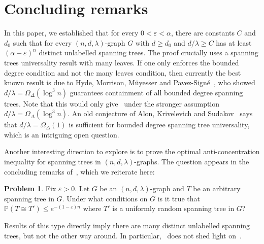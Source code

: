 \documentclass[reqno,final,a4paper]{amsart}
\numberwithin{equation}{section}
\theoremstyle{definition}
\newtheorem{problem}[theorem]{Problem}
\theoremstyle{remark}
\renewcommand{\Pr}{\mathbb{P}}
\newcommand{\eps}{\varepsilon}
\begin{document}
\section{Concluding remarks}
In this paper, we established that for every $0<\eps<\alpha$, there are constants $C$ and $d_0$ such that for every $(n,d,\lambda)$-graph $G$ with $d\geq d_0$ and $d/\lambda\geq C$ has at least $(\alpha-\eps)^n$ distinct unlabelled spanning trees.
The proof crucially uses a spanning trees universality result with many leaves. If one only enforces the bounded degree condition and not the many leaves condition, then currently the best known result is due to Hyde, Morrison, M\"{u}yesser and Pavez-Sign\'{e}~\cite{Hyde-et-al}, who showed $d/\lambda =\Omega_\Delta(\log ^3n)$ guarantees containment of all bounded degree spanning trees. 
Note that this would only give~ under the stronger assumption $d/\lambda = \Omega_\Delta(\log^3n)$.
An old conjecture of Alon, Krivelevich and Sudakov~\cite{Alon-et-al} says that $d/\lambda = \Omega_\Delta(1)$ is sufficient for bounded degree spanning tree universality, which is an intriguing open question.

Another interesting direction to explore is to prove the optimal anti-concentration inequality for spanning trees in $(n,d,\lambda)$-graphs. The question appears in the concluding remarks of~\cite{Lee}, which we reiterate here:
\begin{problem}\label{prob}
    Fix $\eps > 0$.
    Let $G$ be an $(n,d,\lambda)$-graph and $T$ be an arbitrary spanning tree in $G$. Under what conditions on $G$ is it true that $\Pr(T\cong T') \leq e^{-(1-\eps)n}$ where $T'$ is a uniformly random spanning tree in $G$? 
\end{problem}
Results of this type directly imply there are many distinct unlabelled spanning trees, but not the other way around. In particular,~ does not shed light on~.
\end{document}
